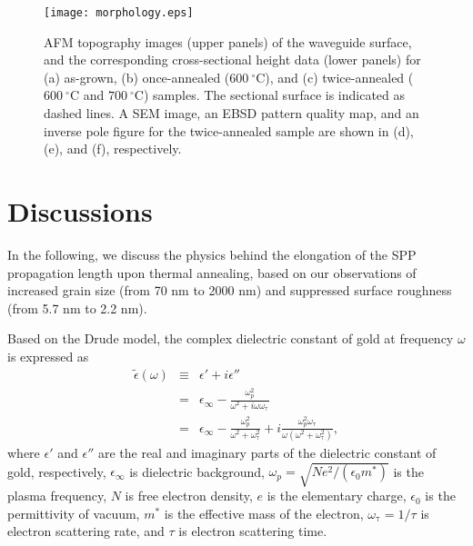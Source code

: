 \documentclass[aip,apl,reprint]{revtex4-1}
\begin{document}
  \begin{figure}
    \texttt{[image: morphology.eps]}
        \caption{AFM topography images (upper panels) of the waveguide surface, and the corresponding cross-sectional height data (lower panels) for (a) as-grown, (b) once-annealed ($600\:^\circ\mathrm{C}$), and (c) twice-annealed ($600\:^\circ\mathrm{C}$ and $700\:^\circ\mathrm{C}$) samples. The sectional surface is indicated as dashed lines. A SEM image, an EBSD pattern quality map, and an inverse pole figure for the twice-annealed sample are shown in (d), (e), and (f), respectively.}
    \label{fig:morphology}
\end{figure}

\section{Discussions}
\label{sec:discussion}
In the following, we discuss the physics behind the elongation of the SPP propagation length upon thermal annealing, based on our observations of increased grain size (from 70 nm to 2000 nm) and suppressed surface roughness (from 5.7 nm to 2.2 nm). 

Based on the Drude model, the complex dielectric constant of gold at frequency $\omega$ is expressed as
\begin{eqnarray}
\tilde{\epsilon}(\omega) &\equiv& \epsilon' + i \epsilon'' \nonumber \\
&=& \epsilon_{\infty} - \frac{\omega_p^2}{\omega^2+i\omega \omega_{\mathrm{\tau}}} \nonumber \\
&=& \epsilon_{\infty} - \frac{\omega_p^2}{\omega^2+ \omega_{\mathrm{\tau}}^2} + i \frac{\omega_p^2 \omega_{\mathrm{\tau}}}{\omega (\omega^2 + \omega_{\mathrm{\tau}}^2)},
\label{eq:permittivity}
\end{eqnarray}
where $\epsilon'$ and $\epsilon''$ are the real and imaginary parts of the dielectric constant of gold, respectively, $\epsilon_{\infty}$ is dielectric background,  $\omega_p=\sqrt{Ne^2/ (\epsilon_0 m^*)}$ is the plasma frequency, $N$ is free electron density, $e$ is the elementary charge, $\epsilon_0$ is the permittivity of vacuum, $m^*$ is the effective mass of the electron, $\omega_{\mathrm{\tau}}=1/\tau$ is electron scattering rate, and $\tau$ is electron scattering time. 
\end{document}
